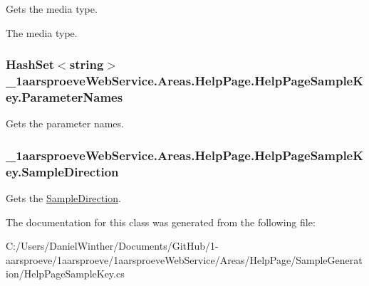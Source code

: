 Gets the media type. 

The media type. \hypertarget{class__1aarsproeve_web_service_1_1_areas_1_1_help_page_1_1_help_page_sample_key_a2e76cfdbf00172ca1a0dedc0073aeb7b}{}
\subsubsection[{Parameter\+Names}]{\setlength{\rightskip}{0pt plus 5cm}Hash\+Set$<$string$>$ \+\_\+1aarsproeve\+Web\+Service.\+Areas.\+Help\+Page.\+Help\+Page\+Sample\+Key.\+Parameter\+Names\hspace{0.3cm}{\ttfamily [get]}}\label{class__1aarsproeve_web_service_1_1_areas_1_1_help_page_1_1_help_page_sample_key_a2e76cfdbf00172ca1a0dedc0073aeb7b}


Gets the parameter names. 

\hypertarget{class__1aarsproeve_web_service_1_1_areas_1_1_help_page_1_1_help_page_sample_key_a69980321c5a86fc11bbd2d4b3bca84ef}{}
\subsubsection[{Sample\+Direction}]{ \+\_\+1aarsproeve\+Web\+Service.\+Areas.\+Help\+Page.\+Help\+Page\+Sample\+Key.\+Sample\+Direction\hspace{0.3cm}{\ttfamily [get]}}\label{class__1aarsproeve_web_service_1_1_areas_1_1_help_page_1_1_help_page_sample_key_a69980321c5a86fc11bbd2d4b3bca84ef}


Gets the \hyperlink{class__1aarsproeve_web_service_1_1_areas_1_1_help_page_1_1_help_page_sample_key_a69980321c5a86fc11bbd2d4b3bca84ef}{Sample\+Direction}. 



The documentation for this class was generated from the following file\+:\begin{DoxyCompactItemize}
\item 
C\+:/\+Users/\+Daniel\+Winther/\+Documents/\+Git\+Hub/1-\/aarsproeve/1aarsproeve/1aarsproeve\+Web\+Service/\+Areas/\+Help\+Page/\+Sample\+Generation/Help\+Page\+Sample\+Key.\+cs\end{DoxyCompactItemize}
